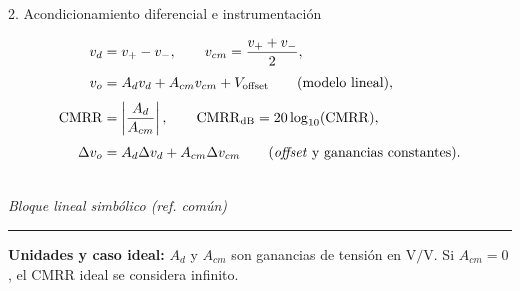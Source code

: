 \documentclass[10pt, a4paper]{article}
\begin{document}
\begin{formulabox}{2. Acondicionamiento diferencial e instrumentación}
    \begin{minipage}[t]{0.62\textwidth}
        \begin{align}
            v_d &= v_+ - v_-, \qquad v_{cm} = \frac{v_+ + v_-}{2}, \label{eq:vd_vcm} \\[3pt]
            v_o &= A_d v_d + A_{cm} v_{cm} + V_{\mathrm{offset}} \qquad \text{(modelo lineal)}, \label{eq:vo_inamp} \\[3pt]
            \mathrm{CMRR} &= \left|\frac{A_d}{A_{cm}}\right|, \qquad \mathrm{CMRR}_{\mathrm{dB}} = 20\log_{10}(\mathrm{CMRR}), \label{eq:cmrr} \\[3pt]
            \Delta v_o &= A_d \Delta v_d + A_{cm} \Delta v_{cm} \qquad \text{(\textit{offset} y ganancias constantes)}. \label{eq:delta_vo}
        \end{align}
    \end{minipage}%
    \hfill
    \begin{minipage}[t]{0.35\textwidth}
        \centering
        \vspace{0.25cm}
        \\[0.05cm]
        {\scriptsize\textit{Bloque lineal simbólico (ref. común)}}
    \end{minipage}

    \vspace{0.12cm}
    \hrule
    \vspace{0.12cm}
    \footnotesize
    \textbf{Unidades y caso ideal:} $A_d$ y $A_{cm}$ son ganancias de tensión en $\mathrm{V/V}$. Si $A_{cm} = 0$, el $\mathrm{CMRR}$ ideal se considera infinito.
\end{formulabox}
\end{document}
